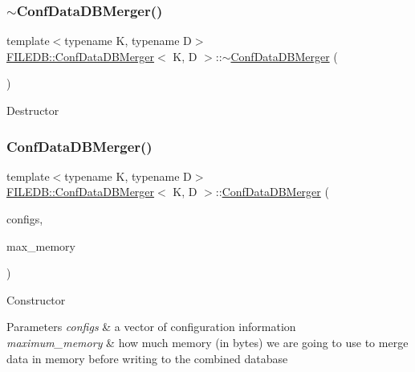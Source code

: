 \subsubsection{\texorpdfstring{$\sim$ConfDataDBMerger()}{~ConfDataDBMerger()}\hspace{0.1cm}{\footnotesize\ttfamily [2/3]}}
{\footnotesize\ttfamily template$<$typename K, typename D$>$ \\
\mbox{\hyperlink{classFILEDB_1_1ConfDataDBMerger}{F\+I\+L\+E\+D\+B\+::\+Conf\+Data\+D\+B\+Merger}}$<$ K, D $>$\+::$\sim$\mbox{\hyperlink{classFILEDB_1_1ConfDataDBMerger}{Conf\+Data\+D\+B\+Merger}} (\begin{DoxyParamCaption}\item[{void}]{ }\end{DoxyParamCaption})\hspace{0.3cm}{\ttfamily [inline]}}

Destructor \mbox{\label{classFILEDB_1_1ConfDataDBMerger_a2d22aeb10cb29cd9acb42cbd042c74d3}} 
\subsubsection{\texorpdfstring{ConfDataDBMerger()}{ConfDataDBMerger()}\hspace{0.1cm}{\footnotesize\ttfamily [5/6]}}
{\footnotesize\ttfamily template$<$typename K, typename D$>$ \\
\mbox{\hyperlink{classFILEDB_1_1ConfDataDBMerger}{F\+I\+L\+E\+D\+B\+::\+Conf\+Data\+D\+B\+Merger}}$<$ K, D $>$\+::\mbox{\hyperlink{classFILEDB_1_1ConfDataDBMerger}{Conf\+Data\+D\+B\+Merger}} (\begin{DoxyParamCaption}\item[{const std\+::vector$<$ \mbox{\hyperlink{classFILEDB_1_1ConfigInfo}{Config\+Info}} $>$ \&}]{configs,  }\item[{unsigned int}]{max\+\_\+memory }\end{DoxyParamCaption})\hspace{0.3cm}{\ttfamily [inline]}}

Constructor 
\begin{DoxyParams}{Parameters}
{\em configs} & a vector of configuration information \\
\hline
{\em maximum\+\_\+memory} & how much memory (in bytes) we are going to use to merge data in memory before writing to the combined database \\
\hline
\end{DoxyParams}
\mbox{\label{classFILEDB_1_1ConfDataDBMerger_a495cdfd447f2ed64776d87601c36a05b}} 
